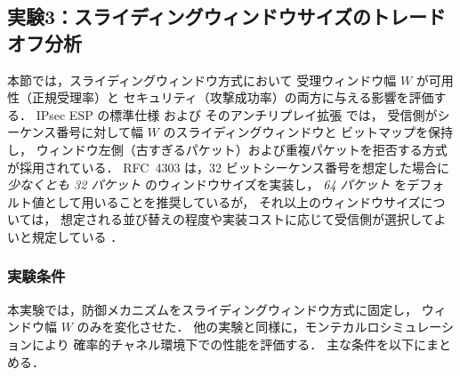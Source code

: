 \documentclass[twocolumn,10pt,a4paper]{jsarticle}
\begin{document}
\subsection{実験3：スライディングウィンドウサイズのトレードオフ分析}

\label{sec:exp3_window}

本節では，スライディングウィンドウ方式において
受理ウィンドウ幅 $W$ が可用性（正規受理率）と
セキュリティ（攻撃成功率）の両方に与える影響を評価する．
IPsec ESP の標準仕様 \cite{rfc4303} および
そのアンチリプレイ拡張 \cite{rfc6479} では，
受信側がシーケンス番号に対して幅 $W$ のスライディングウィンドウと
ビットマップを保持し，
ウィンドウ左側（古すぎるパケット）および重複パケットを拒否する方式が採用されている．
RFC~4303 は，32 ビットシーケンス番号を想定した場合に
\emph{少なくとも 32 パケット} のウィンドウサイズを実装し，
\emph{64 パケット} をデフォルト値として用いることを推奨しているが，
それ以上のウィンドウサイズについては，
想定される並び替えの程度や実装コストに応じて受信側が選択してよいと規定している
\cite{rfc4303}．

\subsubsection{実験条件}

本実験では，防御メカニズムをスライディングウィンドウ方式に固定し，
ウィンドウ幅 $W$ のみを変化させた．
他の実験と同様に，モンテカルロシミュレーションにより
確率的チャネル環境下での性能を評価する．
主な条件を以下にまとめる．
\end{document}
